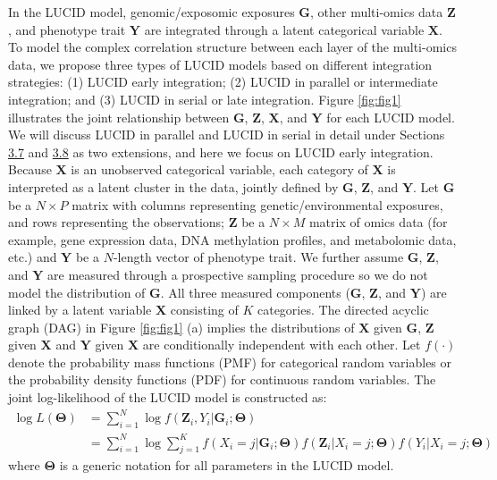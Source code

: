 In the LUCID model, genomic/exposomic exposures
\(\boldsymbol{\mathbf{G}}\), other multi-omics data
\(\boldsymbol{\mathbf{Z}}\), and phenotype trait \(\boldsymbol{\mathbf{Y}}\)
are integrated through a latent categorical variable
\(\boldsymbol{\mathbf{X}}\). To model the complex correlation structure
between each layer of the multi-omics data, we propose three types of
LUCID models based on different integration strategies: (1) LUCID early
integration; (2) LUCID in parallel or intermediate integration; and (3)
LUCID in serial or late integration. Figure \ref{fig:fig1} illustrates
the joint relationship between \(\boldsymbol{\mathbf{G}}\),
\(\boldsymbol{\mathbf{Z}}\), \(\boldsymbol{\mathbf{X}}\), and
\(\boldsymbol{\mathbf{Y}}\) for each LUCID model. We will discuss LUCID in
parallel and LUCID in serial in detail under Sections
\hyperref[sec_parallel]{3.7} and \hyperref[sec_serial]{3.8} as two extensions, and here
we focus on LUCID early integration. Because \(\boldsymbol{\mathbf{X}}\)
is an unobserved categorical variable, each category of
\(\boldsymbol{\mathbf{X}}\) is interpreted as a latent cluster in the
data, jointly defined by \(\boldsymbol{\mathbf{G}}\),
\(\boldsymbol{\mathbf{Z}}\), and \(\boldsymbol{\mathbf{Y}}\). Let
\(\boldsymbol{\mathbf{G}}\) be a \(N \times P\) matrix with columns
representing genetic/environmental exposures, and rows representing the
observations; \(\boldsymbol{\mathbf{Z}}\) be a \(N \times M\) matrix of
omics data (for example, gene expression data, DNA methylation profiles,
and metabolomic data, etc.) and \(\boldsymbol{\mathbf{Y}}\) be a
\(N\)-length vector of phenotype trait. We further assume
\(\boldsymbol{\mathbf{G}}\), \(\boldsymbol{\mathbf{Z}}\), and
\(\boldsymbol{\mathbf{Y}}\) are measured through a prospective sampling
procedure so we do not model the distribution of
\(\boldsymbol{\mathbf{G}}\). All three measured components
(\(\boldsymbol{\mathbf{G}}\), \(\boldsymbol{\mathbf{Z}}\), and
\(\boldsymbol{\mathbf{Y}}\)) are linked by a latent variable
\(\boldsymbol{\mathbf{X}}\) consisting of \(K\) categories. The directed
acyclic graph (DAG) in Figure \ref{fig:fig1} (a) implies the
distributions of \(\boldsymbol{\mathbf{X}}\) given
\(\boldsymbol{\mathbf{G}}\), \(\boldsymbol{\mathbf{Z}}\) given
\(\boldsymbol{\mathbf{X}}\) and \(\boldsymbol{\mathbf{Y}}\) given
\(\boldsymbol{\mathbf{X}}\) are conditionally independent with each other.
Let \(f(\cdot)\) denote the probability mass functions (PMF) for
categorical random variables or the probability density functions (PDF)
for continuous random variables. The joint log-likelihood of the LUCID
model is constructed as:
\[\begin{aligned}
         \log L(\boldsymbol{\mathbf{\Theta}}) & = \sum_{i = 1}^N \log f(\boldsymbol{\mathbf{Z}}_i, Y_i|\boldsymbol{\mathbf{G}}_i;\boldsymbol{\mathbf{\Theta}}) \\
         & = \sum_{i = 1}^N \log \sum_{j = 1}^K f(X_i = j| \boldsymbol{\mathbf{G}}_i; \boldsymbol{\mathbf{\Theta}}) f(\boldsymbol{\mathbf{Z}}_i| X_i = j; \boldsymbol{\mathbf{\Theta}}) f(Y_i|X_i = j; \boldsymbol{\mathbf{\Theta}})
    \end{aligned}
    \label{eq1}   \label{eq:eq1}\]
where \(\boldsymbol{\mathbf{\Theta}}\) is a generic notation for all
parameters in the LUCID model.

